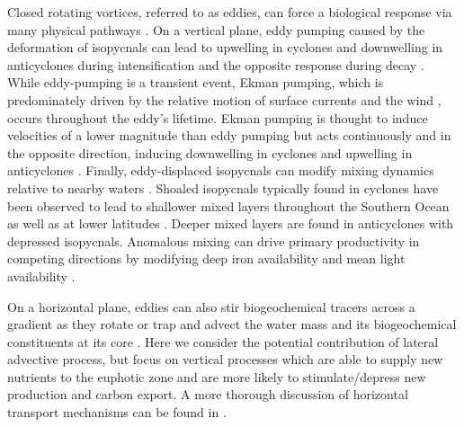 \documentclass{article}
\begin{document}
Closed rotating vortices, referred to as eddies, can force a biological response via many physical pathways \parencite{McGillicuddyMechanismsPhysicalBiologicalBiogeochemicalInteraction2016, GaubeRegionalvariationsinfluence2014}. On a vertical plane, eddy pumping caused by the deformation of isopycnals can lead to upwelling in cyclones and downwelling in anticyclones during intensification \parencite{McGillicuddyInfluencemesoscaleeddies1998, FalkowskiRoleeddypumping1991} and the opposite response during decay \parencite{FranksPredictionphytoplanktongrowth1986}. While eddy-pumping is a transient event, Ekman pumping, which is predominately driven by the relative motion of surface currents and the wind \parencite{DewarEffectsWindRings1987, GaubeRegionalvariationsinfluence2014}, occurs throughout the eddy's lifetime. Ekman pumping is thought to induce velocities of a lower magnitude than eddy pumping but acts continuously and in the opposite direction, inducing downwelling in cyclones and upwelling in anticyclones \parencite{McGillicuddyEddywindinteractions2007,GaubeSatelliteobservationschlorophyll2013}. Finally, eddy-displaced isopycnals can modify mixing dynamics relative to nearby waters \parencite{McGillicuddyMechanismsPhysicalBiologicalBiogeochemicalInteraction2016, SongSeasonalvariationcorrelation2018}. Shoaled isopycnals typically found in cyclones have been observed to lead to shallower mixed layers throughout the Southern Ocean \parencite{HausmannObservedmesoscaleeddy2017} as well as at lower latitudes \parencite{DufoisImpacteddiessurface2014, GaubeSatelliteobservationschlorophyll2013}. Deeper mixed layers are found in anticyclones with depressed isopycnals. 
Anomalous mixing can drive primary productivity in competing directions by modifying deep iron availability  \parencite{CarranzaSouthernOceanwinddriven2015} and mean light availability \parencite{NelsonSverdruprevisitedCritical1991}. 

On a horizontal plane,  eddies can also stir biogeochemical tracers across a gradient as they rotate \parencite{Cheltoninfluencenonlinearmesoscale2011, DoneyMesoscalevariabilitySeaviewing2003} or trap and advect the water mass and its biogeochemical constituents at its core \parencite{FlierlParticlemotionslargeamplitude1981, LehahnLongrangetransport2011, EarlyEvolutionPropagationQuasigeostrophic2011}. Here we consider the potential contribution of lateral advective process, but focus on vertical processes which are able to supply new nutrients to the euphotic zone and are more likely to stimulate/depress new production and carbon export. A more thorough discussion of horizontal transport mechanisms can be found in \textcite{FrengerImprintSouthernOcean2018}. 
\end{document}
